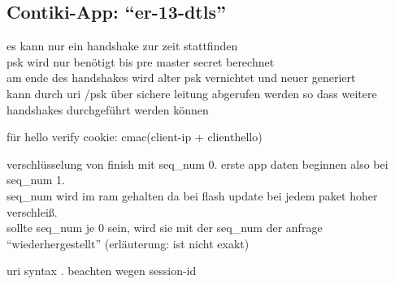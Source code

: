 \subsection{Contiki-App: "`er-13-dtls"'}

es kann nur ein handshake zur zeit stattfinden\\
psk wird nur benötigt bis pre master secret berechnet\\
am ende des handshakes wird alter psk vernichtet und neuer generiert\\
kann durch uri /psk über sichere leitung abgerufen werden so dass weitere handshakes durchgeführt werden können

für hello verify cookie: cmac(client-ip + clienthello)

verschlüsselung von finish mit seq\_num 0. erste app daten beginnen also bei seq\_num 1.\\
seq\_num wird im ram gehalten da bei flash update bei jedem paket hoher verschleiß.\\
sollte seq\_num je 0 sein, wird sie mit der seq\_num der anfrage "`wiederhergestellt"' (erläuterung: ist nicht exakt)

uri syntax \cite{rfc3986}. beachten wegen session-id